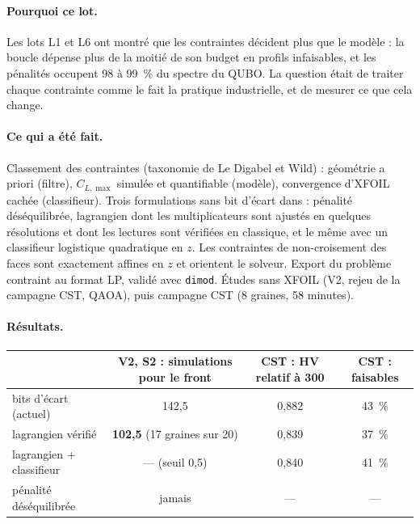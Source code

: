 \documentclass[11pt,a4paper]{report}
\begin{document}
\paragraph{Pourquoi ce lot.} Les lots L1 et L6 ont montré que les contraintes décident plus que le modèle : la boucle dépense plus de la moitié de son budget en profils infaisables, et les pénalités occupent 98 à 99~\% du spectre du QUBO. La question était de traiter chaque contrainte comme le fait la pratique industrielle, et de mesurer ce que cela change.

\paragraph{Ce qui a été fait.} Classement des contraintes (taxonomie de Le Digabel et Wild) : géométrie a priori (filtre), $C_{L,\max}$ simulée et quantifiable (modèle), convergence d'XFOIL cachée (classifieur). Trois formulations sans bit d'écart dans  : pénalité déséquilibrée, lagrangien dont les multiplicateurs sont ajustés en quelques résolutions et dont les lectures sont vérifiées en classique, et le même avec un classifieur logistique quadratique en $z$. Les contraintes de non-croisement des faces sont exactement affines en $z$ et orientent le solveur. Export du problème contraint au format LP, validé avec \texttt{dimod}. Études sans XFOIL (V2, rejeu de la campagne CST, QAOA), puis campagne CST (8 graines, 58 minutes).

\paragraph{Résultats.}
\begin{center}
\small
\begin{tabular}{lccc}
\toprule
& V2, S2 : simulations pour le front & CST : HV relatif à 300 & CST : faisables \\
\midrule
bits d'écart (actuel) & 142,5 & 0,882 & 43~\% \\
lagrangien vérifié & \textbf{102,5} (17 graines sur 20) & 0,839 & 37~\% \\
lagrangien + classifieur & --- (seuil 0,5) & 0,840 & 41~\% \\
pénalité déséquilibrée & jamais & --- & --- \\
\bottomrule
\end{tabular}
\end{center}
\end{document}
